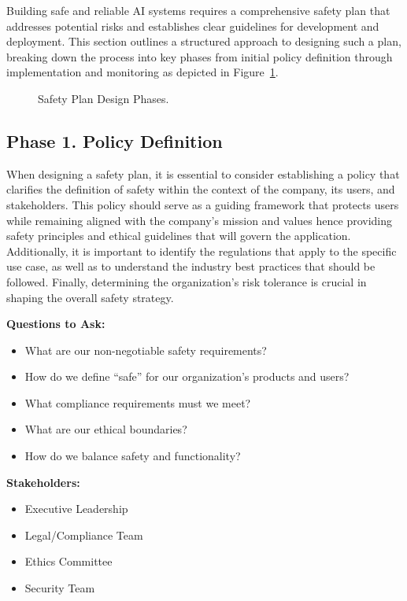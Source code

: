Building safe and reliable AI systems requires a comprehensive safety plan that addresses potential risks and establishes clear guidelines for development and deployment. This section outlines a structured approach to designing such a plan, breaking down the process into key phases from initial policy definition through implementation and monitoring as depicted in Figure~\ref{safety-plan}.

\begin{figure}[H]
\centering

\caption{Safety Plan Design Phases.}
\label{safety-plan}
\end{figure}

\subsection{Phase 1. Policy Definition}

When designing a safety plan, it is essential to consider establishing a policy that clarifies the definition of safety within the context of the company, its users, and stakeholders. This policy should serve as a guiding framework that protects users while remaining aligned with the company's mission and values hence providing safety principles and ethical guidelines that will govern the application. Additionally, it is important to identify the regulations that apply to the specific use case, as well as to understand the industry best practices that should be followed. Finally, determining the organization's risk tolerance is crucial in shaping the overall safety strategy.

\textbf{Questions to Ask:}
\begin{itemize}
    \item What are our non-negotiable safety requirements?
    \item How do we define ``safe'' for our organization's products and users?
    \item What compliance requirements must we meet?
    \item What are our ethical boundaries?
    \item How do we balance safety and functionality?
\end{itemize}

\textbf{Stakeholders:}
\begin{itemize}
    \item Executive Leadership
    \item Legal/Compliance Team
    \item Ethics Committee
    \item Security Team
\end{itemize}

